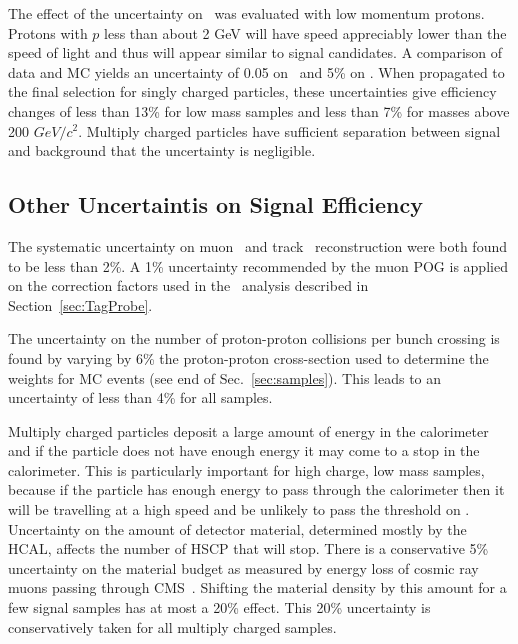 The effect of the uncertainty on \dedx\ was evaluated with low momentum protons. Protons with $p$ less than  about 2 GeV will have speed appreciably lower than the
speed of light and thus will appear similar to signal candidates. A comparison of data and MC yields an uncertainty of 0.05 on \ias\ and 5\% on \ih. %
When propagated to the final selection for singly charged particles, these uncertainties give efficiency changes of less than 13\% for low mass samples
and less than 7\% for masses above 200 $GeV/c^2$. Multiply charged particles have sufficient
separation between signal and background that the uncertainty is negligible.


\subsection{Other Uncertaintis on Signal Efficiency}

The systematic uncertainty on muon~\cite{2012JInst...7P0002T} and track~\cite{CMS-PAS-TRK-10-002} reconstruction were both found to be less than 2\%.
A 1\% uncertainty recommended by the muon POG is applied on the correction factors used in the \muononly\ analysis described in Section~\ref{sec:TagProbe}.

The uncertainty on the number of proton-proton collisions per bunch crossing is found by varying by 6\% the 
proton-proton cross-section used to determine the weights for MC events (see end of Sec.~\ref{sec:samples}).
This leads to an uncertainty of less than 4\% for all samples.

Multiply charged particles deposit a large amount of energy in the calorimeter and if the particle does not have enough energy it may come to a stop in the calorimeter.
This is particularly important for high charge, low mass samples, because if the particle has enough energy to pass through the calorimeter then it will
be travelling at a high speed and be unlikely to pass the threshold on \invbeta. Uncertainty on the amount of detector material, determined mostly by the
HCAL, affects the number of HSCP that will stop. There is a conservative 5\% uncertainty on the material budget as measured by energy loss of cosmic ray muons
passing through CMS~\cite{2010JInst...5T3021C}. Shifting the material density by this amount for a few signal samples has at most a 20\% effect. This 20\% uncertainty is
conservatively taken for all multiply charged samples.

